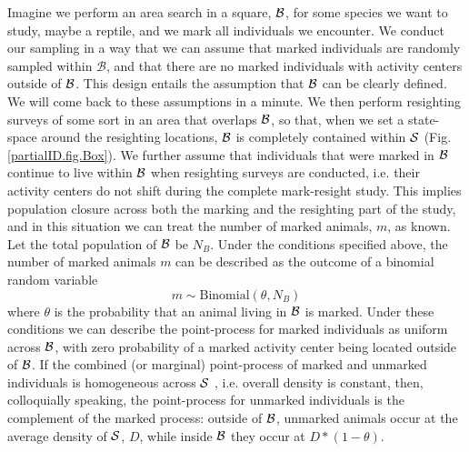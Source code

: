 Imagine we perform an area search in a square, ${\cal B}$, for some species we want to study, maybe a reptile, and we mark all individuals we encounter. We conduct our sampling in a way that we can assume that marked individuals are randomly
sampled within $\mathcal{B}$, and that there are no marked individuals with activity centers outside of ${\cal B}$.
This design entails the assumption that ${\cal B}$ can be clearly defined. We will come back to these assumptions in a minute. We then perform resighting surveys of some sort in an area that overlaps ${\cal B}$, so that, when we set a state-space around the resighting locations, ${\cal B}$ is completely contained within ${\cal S}$ (Fig. \ref{partialID.fig.Box}). We further assume that individuals that were marked in ${\cal B}$ continue to live within ${\cal B}$ when resighting surveys are conducted, i.e. their activity centers do not shift during the complete mark-resight study. This implies population closure across both the marking and the resighting part of the study, and in this situation we can treat the number of marked animals,  $m$, as known.
Let the total population of ${\cal B}$ be $N_B$. Under the conditions specified above, the number of marked animals $m$ can be described as the outcome of a binomial random variable
\[
m \sim \mbox{Binomial}(\theta, N_B)
\]
where $\theta$ is the probability that an animal living in ${\cal B}$ is marked.
Under these conditions we can describe the point-process for marked individuals as uniform across ${\cal B}$, with zero probability of a marked activity center being located outside of ${\cal B}$. If the combined (or marginal) point-process of marked and unmarked individuals is homogeneous across ${\cal S}$ , i.e. overall density is constant, then, colloquially speaking, the point-process for unmarked individuals is the complement of the marked process: outside of ${\cal B}$, unmarked animals occur at the average density of ${\cal S}$, $D$, while inside ${\cal B}$ they occur at $D * (1-\theta)$.

